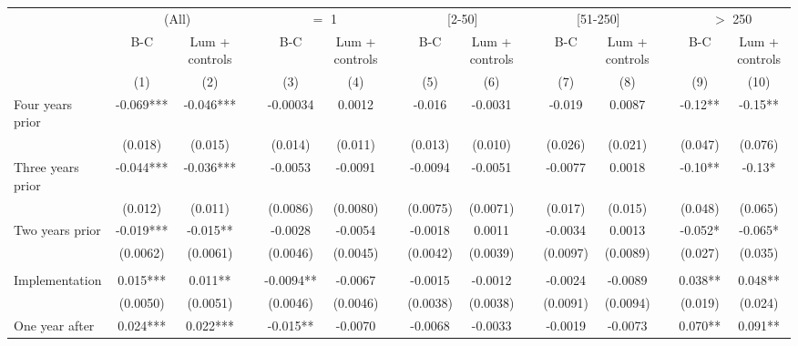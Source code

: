 \begin{tabular}{lcccccccccccccc}
\toprule
      & \multicolumn{2}{c}{(All)} &       & \multicolumn{2}{c}{$=$ 1} &       & \multicolumn{2}{c}{[2-50]} &       & \multicolumn{2}{c}{[51-250]} &       & \multicolumn{2}{c}{$>$ 250} \\
\cmidrule{2-3}\cmidrule{5-6}\cmidrule{8-9}\cmidrule{11-12}\cmidrule{14-15}      & B-C   & Lum + controls &       & B-C   & Lum + controls &       & B-C   & Lum + controls &       & B-C   & Lum + controls &       & B-C   & Lum + controls \\
\midrule
      & (1)   & (2)   &       & (3)   & (4)   &       & (5)   & (6)   &       & (7)   & (8)   &       & (9)   & (10) \\
\midrule
\midrule
Four years prior & -0.069*** & -0.046*** &       & -0.00034 & 0.0012 &       & -0.016 & -0.0031 &       & -0.019 & 0.0087 &       & -0.12** & -0.15** \\
      & (0.018) & (0.015) &       & (0.014) & (0.011) &       & (0.013) & (0.010) &       & (0.026) & (0.021) &       & (0.047) & (0.076) \\
Three years prior & -0.044*** & -0.036*** &       & -0.0053 & -0.0091 &       & -0.0094 & -0.0051 &       & -0.0077 & 0.0018 &       & -0.10** & -0.13* \\
      & (0.012) & (0.011) &       & (0.0086) & (0.0080) &       & (0.0075) & (0.0071) &       & (0.017) & (0.015) &       & (0.048) & (0.065) \\
Two years prior & -0.019*** & -0.015** &       & -0.0028 & -0.0054 &       & -0.0018 & 0.0011 &       & -0.0034 & 0.0013 &       & -0.052* & -0.065* \\
      & (0.0062) & (0.0061) &       & (0.0046) & (0.0045) &       & (0.0042) & (0.0039) &       & (0.0097) & (0.0089) &       & (0.027) & (0.035) \\
      &       &       &       &       &       &       &       &       &       &       &       &       &       &  \\
Implementation & 0.015*** & 0.011** &       & -0.0094** & -0.0067 &       & -0.0015 & -0.0012 &       & -0.0024 & -0.0089 &       & 0.038** & 0.048** \\
      & (0.0050) & (0.0051) &       & (0.0046) & (0.0046) &       & (0.0038) & (0.0038) &       & (0.0091) & (0.0094) &       & (0.019) & (0.024) \\
One year after & 0.024*** & 0.022*** &       & -0.015** & -0.0070 &       & -0.0068 & -0.0033 &       & -0.0019 & -0.0073 &       & 0.070** & 0.091** \\

\end{tabular}
